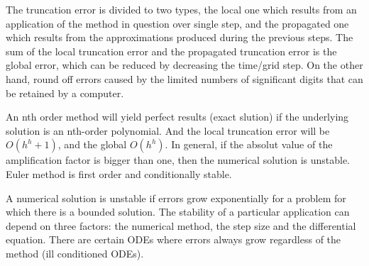 \documentclass[a4paper,10pt,twoside]{article}
\begin{document}
The truncation error is divided to two types, the local one which results from an application of the method in question over single step, and the propagated one which results from the approximations produced during the previous steps. The sum of the local truncation error and the propagated truncation error is the global error, which can be reduced by decreasing the time/grid step. On the other hand, round off errors caused by the limited numbers of significant digits that can be retained by a computer.



An nth order method will yield perfect results (exact slution) if the underlying solution is an nth-order polynomial. And the local truncation error will be $O(h^h+1)$, and the global $O(h^h)$. In general, if the absolut value of the amplification factor is bigger than one, then the numerical solution is unstable. Euler method is first order and conditionally stable.


A numerical solution is unstable if errors grow exponentially for a problem for which there is a bounded solution. The stability of a particular application can depend on three factors: the numerical method, the step size and the differential equation. There are certain ODEs where errors always grow regardless of the method (ill conditioned ODEs). 
\end{document}
